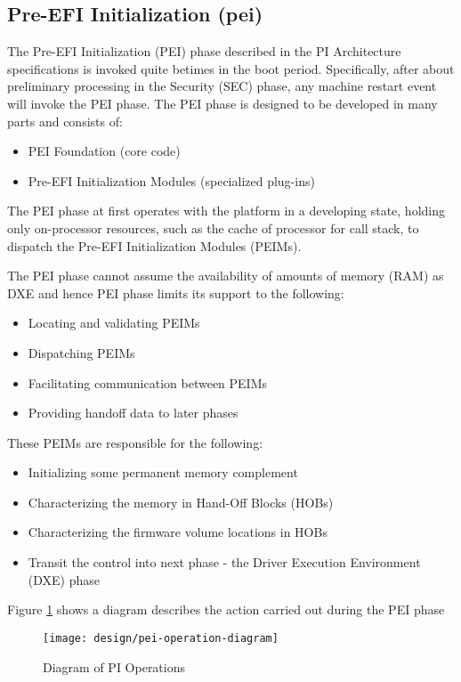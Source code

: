 \subsection{Pre-EFI Initialization (\gls{pei})}
The Pre-EFI Initialization (PEI) phase described in the PI Architecture specifications is invoked quite betimes in the boot period. Specifically, after about preliminary processing in the Security (SEC) phase, any machine restart event will invoke the PEI phase.
The PEI phase is designed to be developed in many parts and consists of:
\begin{itemize}
	\item PEI Foundation (core code)
	\item Pre-EFI Initialization Modules (specialized plug-ins)
\end{itemize}
The PEI phase at first operates with the platform in a developing state, holding only on-processor resources, such as the cache of processor for call stack, to dispatch the Pre-EFI Initialization Modules (PEIMs).

The PEI phase cannot assume the availability of amounts of memory (RAM) as DXE and hence PEI phase limits its support to the following:
\begin{itemize}
	\item Locating and validating PEIMs
	\item Dispatching PEIMs
	\item Facilitating communication between PEIMs
	\item Providing handoff data to later phases
\end{itemize}

These PEIMs are responsible for the following:
\begin{itemize}
	\item Initializing some permanent memory complement
	\item Characterizing the memory in Hand-Off Blocks (HOBs)
	\item Characterizing the firmware volume locations in HOBs
	\item Transit the control into next phase - the Driver Execution Environment (DXE) phase
\end{itemize}

Figure \ref{fig:design-pei-operation-diagram} shows a diagram describes the action carried out during the PEI phase

\begin{figure}[h]
	\centering
	\texttt{[image: design/pei-operation-diagram]}
	\caption{Diagram of PI Operations}\label{fig:design-pei-operation-diagram}
\end{figure}

